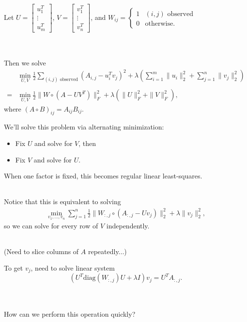 \documentclass[12pt]{beamer}
\newcommand{\bmat}[1]{\begin{bmatrix}#1\end{bmatrix}}
\begin{document}
\begin{frame}
Let $U = \bmat{u_1^T \\ \vdots \\ u_m^T}$, $V = \bmat{v_1^T \\ \vdots \\ v_n^T}$, and $ W_{ij} = \begin{cases} 1 & (i,j) \mbox{ observed} \\ 0 & \mbox{otherwise.} \end{cases}$
\\~
\\~

Then we solve
\begin{align*}
&\min_{U,V} \frac{1}{2} \sum_{(i,j) \mbox{ observed}} (A_{i,j} - u_i^T v_j)^2 + \lambda \left( \sum_{i=1}^m \|u_i\|_2^2 + \sum_{j=1}^n \|v_j\|_2^2 \right) \\~\\
=&\min_{U,V} \frac{1}{2}\|W \circ (A - UV^T)\|^2_F + \lambda \left( \|U\|_F^2 + \|V\|_F^2 \right),
\end{align*}
where $(A \circ B)_{ij} = A_{ij} B_{ij}$.
\end{frame}

\begin{frame}
We'll solve this problem via alternating minimization:
\begin{itemize}
\item Fix $U$ and solve for $V$, then
\item Fix $V$ and solve for $U$.
\end{itemize}
When one factor is fixed, this becomes regular linear least-squares.
\\~

Notice that this is equivalent to solving
\begin{align*}
\min_{v_1, \dots, v_n} \sum_{j=1}^n \frac{1}{2} \|W_{:,j} \circ (A_{:,j} - Uv_j)\|_2^2 + \lambda \|v_j\|_2^2,
\end{align*}
so we can solve for every row of $V$ independently.
\\~

(Need to slice columns of $A$ repeatedly...)
\end{frame}

\begin{frame}
To get $v_j$, need to solve linear system
$$ \left( U^T \mbox{diag} (W_{:,j}) U + \lambda I \right) v_j = U^T A_{:,j}. $$
\\~

How can we perform this operation quickly?
\end{frame}
\end{document}
